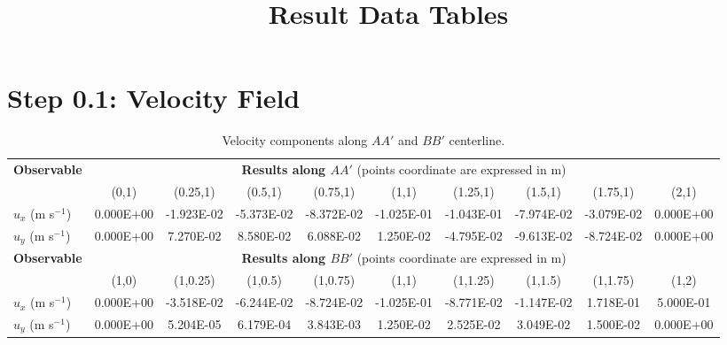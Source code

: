 \documentclass[letterpaper,11pt]{article}
\begin{document}
%
\title{Result Data Tables}
\author{}
\date{}
%
\maketitle
%
\section*{Step 0.1: Velocity Field}

\begin{table}[htb!]
	\caption{Velocity components along $AA'$ and $BB'$ centerline.}
	\centering
	\footnotesize
	\setlength\tabcolsep{1.5pt}
	\begin{tabular}{l c c c c c c c c c}
		\toprule
		\multirow{2}{*}{\textbf{Observable}} & \multicolumn{9}{c}{\textbf{Results along $AA'$} (points coordinate are expressed in m)} \\
		& {(0,1)} & {(0.25,1)} & {(0.5,1)} & {(0.75,1)} & {(1,1)} & {(1.25,1)} & {(1.5,1)} & {(1.75,1)} & {(2,1)} \\
		\midrule
		$u_x$ (m s$^{-1}$) & 0.000E+00 & -1.923E-02 & -5.373E-02 & -8.372E-02 & -1.025E-01 & -1.043E-01 & -7.974E-02 & -3.079E-02 & 0.000E+00 \\
		$u_y$ (m s$^{-1}$) & 0.000E+00 & 7.270E-02 & 8.580E-02 & 6.088E-02 & 1.250E-02 & -4.795E-02 & -9.613E-02 & -8.724E-02 & 0.000E+00\\
		\midrule
		\midrule
		\multirow{2}{*}{\textbf{Observable}} & \multicolumn{9}{c}{\textbf{Results along $BB'$} (points coordinate are expressed in m)} \\
		& {(1,0)} & {(1,0.25)} & {(1,0.5)} & {(1,0.75)} & {(1,1)} & {(1,1.25)} & {(1,1.5)} & {(1,1.75)} & {(1,2)} \\
		\midrule
		$u_x$ (m s$^{-1}$) & 0.000E+00 & -3.518E-02 & -6.244E-02 & -8.724E-02 & -1.025E-01 & -8.771E-02 & -1.147E-02 & 1.718E-01 & 5.000E-01 \\
		$u_y$ (m s$^{-1}$) & 0.000E+00 & 5.204E-05 & 6.179E-04 & 3.843E-03 & 1.250E-02 & 2.525E-02 & 3.049E-02 & 1.500E-02 & 0.000E+00\\
		\bottomrule
	\end{tabular}
\end{table}
\end{document}
